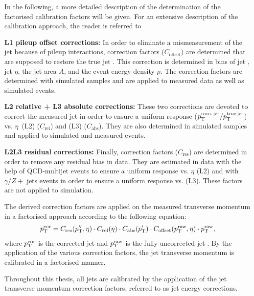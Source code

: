 In the following, a more detailed description of the determination of the factorised calibration factors will be given.
For an extensive description of the calibration approach, the reader is referred to~\cite{bib:CMS:JERCPaper_2011}
\begin{description}
\item \textbf{L1 pileup offset corrections:} In order to eliminate a mismeasurement of the jet \pt because of pileup interactions, correction factors ($C_{\mathrm{offset}}$) are determined that are supposed to restore the true jet \pt. This correction is determined in bins of jet \pt, jet $\eta$, the jet area $A$, and the event energy density $\rho$. The correction factors are determined with simulated samples and are applied to measured data as well as simulated events.
\item \textbf{L2 relative + L3 absolute corrections:} These two corrections are devoted to correct the measured jet \pt in order to ensure a uniform response (${p}_\mathrm{T}^{\text{reco.\,jet}}/{p}_\mathrm{T}^{\text{true\,jet}}$) vs. \mbox{$\eta$ (L2)} ($C_{\mathrm{rel}}$) and \mbox{\pt (L3)} ($C_{\mathrm{abs}}$). They are also determined in simulated samples and applied to simulated and measured events.
\item \textbf{L2L3 residual corrections:} Finally, correction factors ($C_\mathrm{res}$) are determined in order to remove any residual bias in data. They are estimated in data with the help of QCD-multijet events to ensure a uniform response vs. $\eta$ (L2) and with $\gamma/Z+$ jets events in order to ensure a uniform response vs. \pt (L3).
These factors are not applied to simulation.\\
\end{description}

The derived correction factors are applied on the measured transverse momentum in a factorised approach according to the following equation:
\begin{equation}
p_{\text{T}}^\mathrm{cor} =  C_\mathrm{res}(p_{\text{T}}'', \eta) \cdot C_{\mathrm{rel}}(\eta) \cdot C_{\mathrm{abs}}(p_{\text{T}}') \cdot C_{\mathrm{offset}}(p_{\text{T}}^\mathrm{raw}, \eta) \cdot  p_{\text{T}}^\mathrm{raw},
\end{equation}
where $p_{\text{T}}^\mathrm{cor}$ is the corrected jet \pt and  $p_{\text{T}}^\mathrm{raw}$ is the fully uncorrected jet \pt.
By the application of the various correction factors, the jet transverse momentum is calibrated in a factorised manner.

Throughout this thesis, all jets are calibrated by the application of the jet transverse momentum correction factors, referred to as jet energy corrections.



